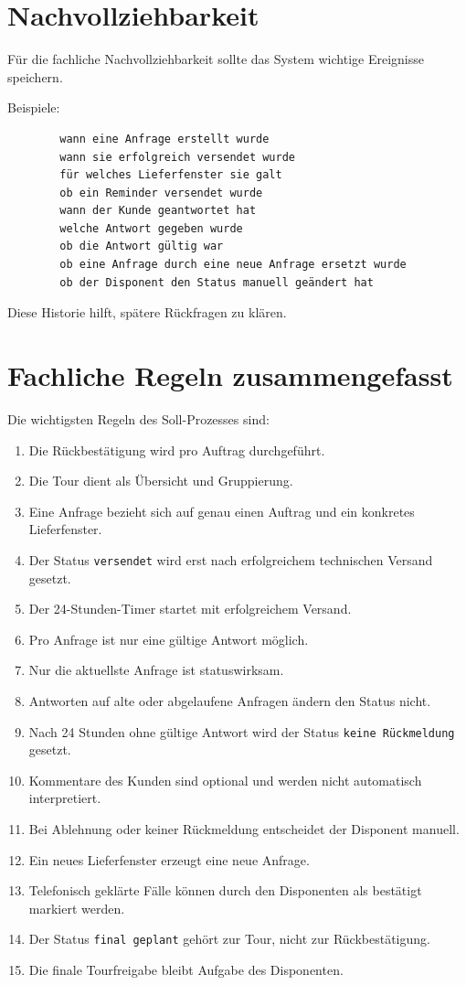 \documentclass[12pt,a4paper]{article}
\begin{document}
	\section{Nachvollziehbarkeit}
	
	Für die fachliche Nachvollziehbarkeit sollte das System wichtige Ereignisse speichern.
	
	Beispiele:
	
	\begin{lstlisting}
		wann eine Anfrage erstellt wurde
		wann sie erfolgreich versendet wurde
		für welches Lieferfenster sie galt
		ob ein Reminder versendet wurde
		wann der Kunde geantwortet hat
		welche Antwort gegeben wurde
		ob die Antwort gültig war
		ob eine Anfrage durch eine neue Anfrage ersetzt wurde
		ob der Disponent den Status manuell geändert hat
	\end{lstlisting}
	
	Diese Historie hilft, spätere Rückfragen zu klären.
	
	\section{Fachliche Regeln zusammengefasst}
	
	Die wichtigsten Regeln des Soll-Prozesses sind:
	
	\begin{enumerate}
		\item Die Rückbestätigung wird pro Auftrag durchgeführt.
		\item Die Tour dient als Übersicht und Gruppierung.
		\item Eine Anfrage bezieht sich auf genau einen Auftrag und ein konkretes Lieferfenster.
		\item Der Status \texttt{versendet} wird erst nach erfolgreichem technischen Versand gesetzt.
		\item Der 24-Stunden-Timer startet mit erfolgreichem Versand.
		\item Pro Anfrage ist nur eine gültige Antwort möglich.
		\item Nur die aktuellste Anfrage ist statuswirksam.
		\item Antworten auf alte oder abgelaufene Anfragen ändern den Status nicht.
		\item Nach 24 Stunden ohne gültige Antwort wird der Status \texttt{keine Rückmeldung} gesetzt.
		\item Kommentare des Kunden sind optional und werden nicht automatisch interpretiert.
		\item Bei Ablehnung oder keiner Rückmeldung entscheidet der Disponent manuell.
		\item Ein neues Lieferfenster erzeugt eine neue Anfrage.
		\item Telefonisch geklärte Fälle können durch den Disponenten als bestätigt markiert werden.
		\item Der Status \texttt{final geplant} gehört zur Tour, nicht zur Rückbestätigung.
		\item Die finale Tourfreigabe bleibt Aufgabe des Disponenten.
	\end{enumerate}
	
\end{document}
